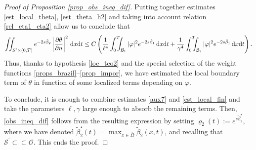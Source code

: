 \documentclass[preprint,10pt]{article}
\numberwithin{equation}{section}
\numberwithin{theorem}{section}
\def\dx{\,\textnormal{d}x}
\def\dt{\textnormal{d}t}
\def\dx{\,\textnormal{d}x}
\def\dt{\textnormal{d}t}
\begin{document}
{\begin{proof}[Proof of Proposition \ref{prop_obs_ineq_dif}]
Putting together estimates \eqref{est_local_theta}, \eqref{est_theta_h2} and taking into account relation \eqref{rel_eta1_eta2} allow us to conclude that
%
\begin{equation}\label{est_local_fin}
\iint_{S^{\prime}\times(0,T)}e^{-2s\tilde\beta_2}\left|\frac{\partial \theta}{\partial n}\right|^2\dx\dt  \leq C\left(\frac{1}{\ell^4}\int_0^T\!\!\!\!\int_{\mathcal B_1}|\varphi|^2e^{-2s\tilde{\beta}_1}\dx\dt+\frac{1}{\gamma^4}\int_0^T\!\!\!\!\int_{\mathcal B_2}|\varphi|^2e^{-2s\tilde{\beta}_1}\dx\dt\right).
\end{equation}
%
Thus, thanks to hypothesis \eqref{loc_teo2} and the special selection of the weight functions \eqref{props_brazil}--\eqref{prop_impor}, we have estimated the local boundary term of $\theta$ in function of some localized terms depending on $\varphi$. 

To conclude, it is enough to combine estimates \eqref{aux7} and \eqref{est_local_fin} and take the parameters $\ell,\gamma$ large enough to absorb the remaining terms. Then, \eqref{obs_ineq_dif} follows from the resulting expression by setting $\varrho_2(t):=e^{s\tilde\beta_2^\star}$, where we have denoted $\tilde{\beta}_2^\star(t)=\max_{x\in\overline{\Omega}}\tilde\beta_2(x,t)$, and recalling that $\mathcal S^\prime\subset\subset \mathcal O$.  This ends the proof. 
%
\end{proof}


}
\end{document}
